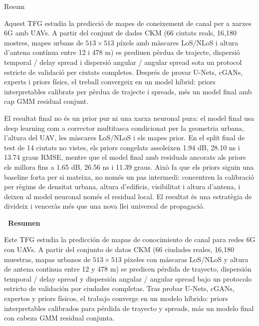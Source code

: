 {}

\begin{center}
  \huge\bfseries\raggedright Resum~\hrulefill
\end{center}
Aquest TFG estudia la predicció de mapes de coneixement de canal per a xarxes
6G amb UAVs. A partir del conjunt de dades CKM (66 ciutats reals, 16{,}180
mostres, mapes urbans de $513\times513$ píxels amb màscares LoS/NLoS i altura
d'antena contínua entre 12 i 478 m) es prediuen pèrdua de trajecte, dispersió
temporal / delay spread i dispersió angular / angular spread sota un protocol
estricte de validació per ciutats completes. Després de provar U-Nets, cGANs,
experts i priors físics, el treball convergeix en un model híbrid: priors
interpretables calibrats per pèrdua de trajecte i spreads, més un model final
amb cap GMM residual conjunt.

El resultat final no és un prior pur ni una xarxa neuronal pura: el model final
usa deep learning com a corrector multitasca condicionat per la geometria
urbana, l'altura del UAV, les màscares LoS/NLoS i els mapes prior. En el split
final de test de 14 ciutats no vistes, els priors congelats assoleixen
1.94 dB, 28.10 ns i 13.74 graus RMSE, mentre que el model final amb residuals
ancorats als priors els millora fins a 1.65 dB, 26.56 ns i 11.39 graus. Això
fa que els priors siguin una baseline forta per si mateixa, no només un pas
intermedi: concentren la calibració per règims de densitat urbana, altura
d'edificis, visibilitat i altura d'antena, i deixen al model neuronal només el
residual local. El resultat és una estratègia de divideix i venceràs més que una
nova llei universal de propagació.

\begin{center}
  \huge\bfseries\raggedleft\vspace*{.5\baselineskip} \hrulefill ~Resumen
\end{center}
Este TFG estudia la predicción de mapas de conocimiento de canal para redes 6G
con UAVs. A partir del conjunto de datos CKM (66 ciudades reales, 16{,}180
muestras, mapas urbanos de $513\times513$ píxeles con máscaras LoS/NLoS y altura de
antena continua entre 12 y 478 m) se predicen pérdida de trayecto, dispersión
temporal / delay spread y dispersión angular / angular spread bajo un protocolo
estricto de validación por ciudades completas. Tras probar U-Nets, cGANs,
expertos y priors físicos, el trabajo converge en un modelo híbrido: priors
interpretables calibrados para pérdida de trayecto y spreads, más un modelo
final con cabeza GMM residual conjunta.

